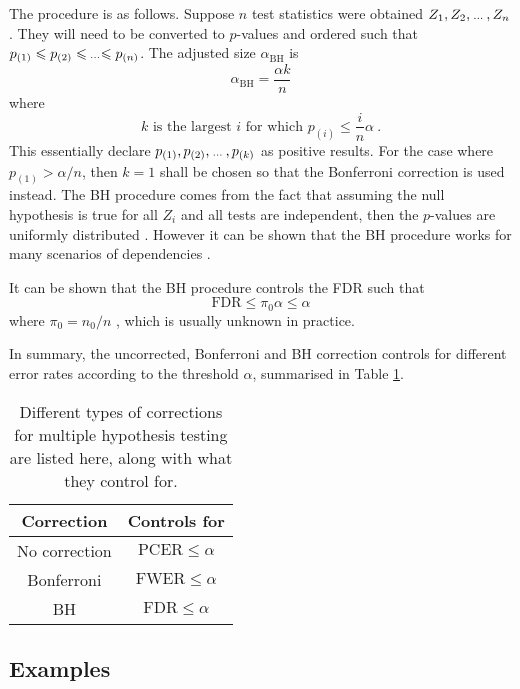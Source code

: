 The procedure is as follows. Suppose $n$ test statistics were obtained $Z_1,Z_2,\dotdotdot,Z_n$. They will need to be converted to $p$-values and ordered such that $p_{(1)}\leqslant p_{(2)}\leqslant \dotdotdot \leqslant p_{(n)}$. The adjusted size $\alpha_{\text{BH}}$ is
\begin{equation}
    \alpha_{\text{BH}} = \frac{\alpha k}{n}
\end{equation}
where
\begin{equation}
    k\text{ is the largest }i\text{ for which }p_{(i)}\leqslant\frac{i}{n}\alpha
    \ .
\end{equation}
This essentially declare $p_{(1)},p_{(2)},\dotdotdot,p_{(k)}$ as positive results. For the case where $p_{(1)}>\alpha/n$, then $k=1$ shall be chosen so that the Bonferroni correction is used instead. The BH procedure comes from the fact that assuming the null hypothesis is true for all $Z_i$ and all tests are independent, then the $p$-values are uniformly distributed \citep{simes1986improved}. However it can be shown that the BH procedure works for many scenarios of dependencies \citep{benjamini2001control}. 

It can be shown that the BH procedure controls the FDR such that
\begin{equation}
    \text{FDR}\leqslant\pi_0\alpha\leqslant\alpha
\end{equation}
where $\pi_0=n_0/n$ \citep{benjamini1995controlling}, which is usually unknown in practice.

In summary, the uncorrected, Bonferroni and BH correction controls for different error rates according to the threshold $\alpha$, summarised in Table \ref{table:inference_corrections}.

\begin{table}
    \centering
    \begin{tabular}{c|c}
        Correction&Controls for\\\hline
        No correction&$\text{PCER}\leqslant\alpha$\\
        Bonferroni&$\text{FWER}\leqslant\alpha$\\
        BH&$\text{FDR}\leqslant\alpha$
    \end{tabular}
    \caption{Different types of corrections for multiple hypothesis testing are listed here, along with what they control for.}
    \label{table:inference_corrections}
\end{table}

\subsection{Examples}

